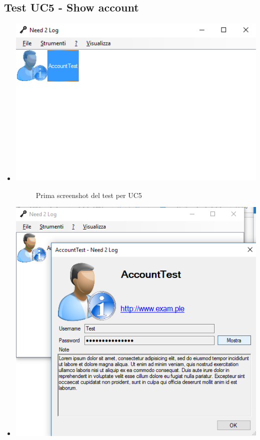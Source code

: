 \documentclass[a4paper,10pt]{report}
\begin{document}
			\subsection{Test UC5 - Show account}
				\begin{itemize}
					\item[] {
						\begin{center}
							\includegraphics[scale=1]{immagini/test/testUC5_1.png}
							\end{center}
						\begin{figure}[!h]
								\caption{Prima screenshot del test per UC5}
							\end{figure}}
					\item[] {
						\begin{center}
							\includegraphics[scale=1]{immagini/test/testUC5_2.png}

\end{center}}
\end{itemize}
\end{document}
